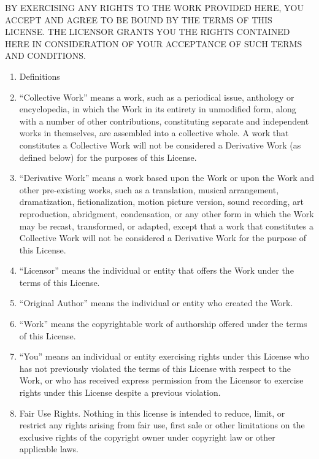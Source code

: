 BY EXERCISING ANY RIGHTS TO THE WORK PROVIDED HERE, YOU ACCEPT AND
AGREE TO BE BOUND BY THE TERMS OF THIS LICENSE. THE LICENSOR GRANTS
YOU THE RIGHTS CONTAINED HERE IN CONSIDERATION OF YOUR ACCEPTANCE
OF SUCH TERMS AND CONDITIONS.

\begin{enumerate}[1.]
\item
  Definitions

\item
  ``Collective Work'' means a work, such as a periodical issue,
  anthology or encyclopedia, in which the Work in its entirety in
  unmodified form, along with a number of other contributions,
  constituting separate and independent works in themselves, are
  assembled into a collective whole. A work that constitutes a
  Collective Work will not be considered a Derivative Work (as
  defined below) for the purposes of this License.

\item
  ``Derivative Work'' means a work based upon the Work or upon the
  Work and other pre-existing works, such as a translation, musical
  arrangement, dramatization, fictionalization, motion picture
  version, sound recording, art reproduction, abridgment,
  condensation, or any other form in which the Work may be recast,
  transformed, or adapted, except that a work that constitutes a
  Collective Work will not be considered a Derivative Work for the
  purpose of this License.

\item
  ``Licensor'' means the individual or entity that offers the Work
  under the terms of this License.

\item
  ``Original Author'' means the individual or entity who created the
  Work.

\item
  ``Work'' means the copyrightable work of authorship offered under
  the terms of this License.

\item
  ``You'' means an individual or entity exercising rights under this
  License who has not previously violated the terms of this License
  with respect to the Work, or who has received express permission
  from the Licensor to exercise rights under this License despite a
  previous violation.

\item
  Fair Use Rights. Nothing in this license is intended to reduce,
  limit, or restrict any rights arising from fair use, first sale or
  other limitations on the exclusive rights of the copyright owner
  under copyright law or other applicable laws.


\end{enumerate}
